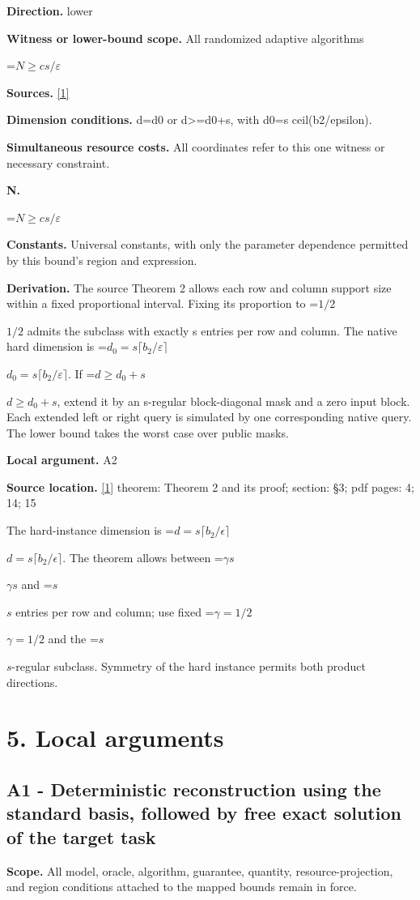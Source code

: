 \documentclass[10pt,a4paper]{article}
\newcommand{\AtlasMath}[1]{\par\begingroup\centering\setbox0=\hbox{$\displaystyle #1$}\ifdim\wd0>1.4\linewidth\typeout{ATLAS WIDE FORMULA: \the\wd0}\fi\ifdim\wd0>\linewidth\resizebox{\linewidth}{!}{\box0}\else\box0\fi\par\endgroup}
\newcommand{\AtlasInlineMath}[1]{\begingroup\setbox0=\hbox{$#1$}\ifdim\wd0>.4\linewidth\endgroup\AtlasMath{#1}\else\endgroup$#1$\fi}
\begin{document}
\textbf{Direction.} lower

\textbf{Witness or lower-bound scope.} All randomized adaptive algorithms

\AtlasMath{N\ge c s/\varepsilon}
\textbf{Sources.} \href{https://arxiv.org/pdf/2402.09379v3}{[1]}

\textbf{Dimension conditions.} d=d0 or d>=d0+s, with d0=s ceil(b2/epsilon).

\textbf{Simultaneous resource costs.} All coordinates refer to this one witness or necessary constraint.

\textbf{N.}

\AtlasMath{N\ge c s/\varepsilon}
\textbf{Constants.} Universal constants, with only the parameter dependence permitted by this bound’s region and expression.

\textbf{Derivation.} The source Theorem 2 allows each row and column support size within a fixed proportional interval. Fixing its proportion to \AtlasInlineMath{1/2} admits the subclass with exactly s entries per row and column. The native hard dimension is \AtlasInlineMath{d_0=s\lceil b_2/\varepsilon\rceil}. If \AtlasInlineMath{d\ge d_0+s}, extend it by an s-regular block-diagonal mask and a zero input block. Each extended left or right query is simulated by one corresponding native query. The lower bound takes the worst case over public masks.

\textbf{Local argument.} A2

\textbf{Source location.} \href{https://arxiv.org/pdf/2402.09379v3}{[1]} theorem: Theorem 2 and its proof; section: §3; pdf pages: 4; 14; 15

The hard-instance dimension is \AtlasInlineMath{d=s\lceil b_2/\epsilon\rceil}. The theorem allows between \AtlasInlineMath{\gamma s} and \AtlasInlineMath{s} entries per row and column; use fixed \AtlasInlineMath{\gamma=1/2} and the \AtlasInlineMath{s}-regular subclass. Symmetry of the hard instance permits both product directions.

\section{5. Local arguments}
\subsection{A1 - Deterministic reconstruction using the standard basis, followed by free exact solution of the target task}
\textbf{Scope.} All model, oracle, algorithm, guarantee, quantity, resource-projection, and region conditions attached to the mapped bounds remain in force.
\end{document}
